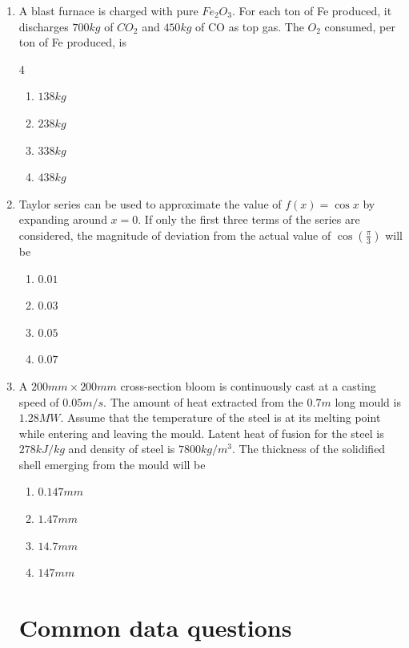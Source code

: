 \documentclass[journal]{IEEEtran}
\theoremstyle{remark}
\begin{document}
\begin{enumerate}
\item   A blast furnace is charged with pure $Fe_2O_3$. For each ton of Fe produced, it discharges $700 kg$ of $CO_2$ and $450 kg$ of CO as top gas. The $O_2$ consumed, per ton of Fe produced, is
\hfill{}

\begin {multicols}{4}
\begin{enumerate}
\item$138 kg$
\item $238 kg$
\item  $338 kg$ 
\item  $438 kg$
\end{enumerate}
\end{multicols}

\item   Taylor series can be used to approximate the value of $f(x) = \cos{x}$ by expanding around $x = 0$. If only the first three terms of the series are considered, the magnitude of deviation from the actual value of $\cos(\frac{\pi}{3})$ will be
\hfill{}
\begin{multicols}{4}
\begin{enumerate}
\item  $0.01$
\item $0.03$
\item $0.05$
\item $0.07$
\end{enumerate}
\end{multicols}

\item  A $200 mm \times 200 mm$ cross-section bloom is continuously cast at a casting speed of $0.05 m/s$. The amount of heat extracted from the $0.7 m$ long mould is $1.28 MW$. Assume that the temperature of the steel is at its melting point while entering and leaving the mould. Latent heat of fusion for the steel is $278 kJ/kg$ and density of steel is $7800 kg/m^3$. The thickness of the solidified shell emerging from the
mould will be \hfill{}
\begin{multicols}{4}
\begin{enumerate}
\item $0.147 mm$
\item $1.47 mm$
\item  $14.7 mm$
\item  $147 mm$
\end{enumerate}
\end{multicols}
\section*{Common data questions}

\end{enumerate}
\end{document}
